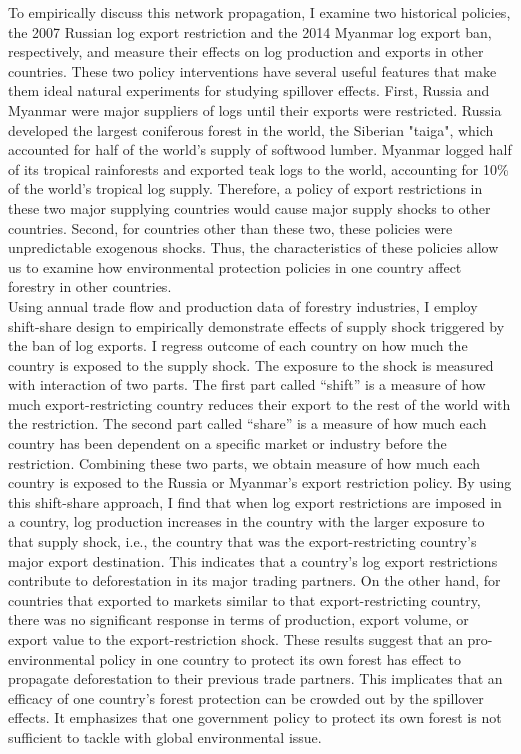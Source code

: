 \documentclass[a4paper,12pt]{article}
\begin{document}
To empirically discuss this network propagation, I examine two historical policies, the 2007 Russian log export restriction and the 2014 Myanmar log export ban, respectively, and measure their effects on log production and exports in other countries. These two policy interventions have several useful features that make them ideal natural experiments for studying spillover effects. First, Russia and Myanmar were major suppliers of logs until their exports were restricted. Russia developed the largest coniferous forest in the world, the Siberian "taiga", which accounted for half of the world's supply of softwood lumber. Myanmar logged half of its tropical rainforests and exported teak logs to the world, accounting for 10\% of the world's tropical log supply. Therefore, a policy of export restrictions in these two major supplying countries would cause major supply shocks to other countries. Second, for countries other than these two, these policies were unpredictable exogenous shocks. Thus, the characteristics of these policies allow us to examine how environmental protection policies in one country affect forestry in other countries.\\

Using annual trade flow and production data of forestry industries, I employ shift-share design to empirically demonstrate effects of supply shock triggered by the ban of log exports. I regress outcome of each country on how much the country is exposed to the supply shock. The exposure to the shock is measured with interaction of two parts. The first part called ``shift'' is a measure of how much export-restricting country reduces their export to the rest of the world with the restriction. The second part called ``share'' is a measure of how much each country has been dependent on a specific market or industry before the restriction. Combining these two parts, we obtain measure of how much each country is exposed to the Russia or Myanmar's export restriction policy. By using this shift-share approach, I find that when log export restrictions are imposed in a country, log production increases in the country with the larger exposure to that supply shock, i.e., the country that was the export-restricting country's major export destination. This indicates that a country's log export restrictions contribute to deforestation in its major trading partners. On the other hand, for countries that exported to markets similar to that export-restricting country, there was no significant response in terms of production, export volume, or export value to the export-restriction shock. These results suggest that an pro-environmental policy in one country to protect its own forest has effect to propagate deforestation to their previous trade partners. This implicates that an efficacy of one country's forest protection can be crowded out by the spillover effects. It emphasizes that one government policy to protect its own forest is not sufficient to tackle with global environmental issue.\\
\end{document}
